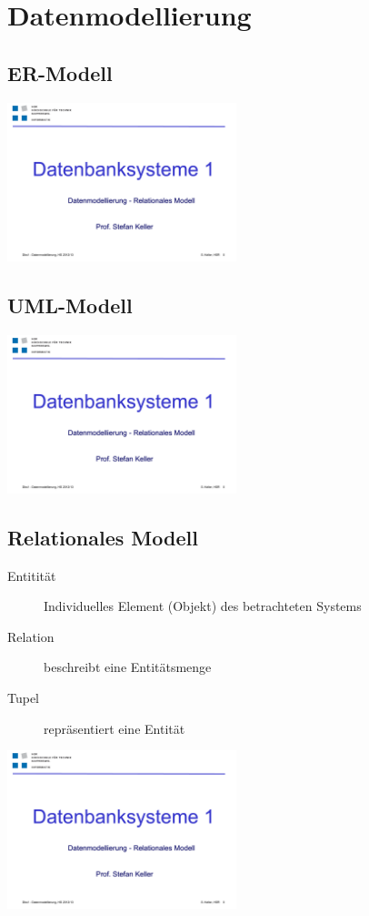 \section{Datenmodellierung}
    \begin{multicols}{2}
        \subsection{ER-Modell}
            \includegraphics[page=16,trim=20 120 20 140,clip=true,width=0.5\textwidth]{images/datenmodellierung.pdf}
        \subsection{UML-Modell}
            \includegraphics[page=29,trim=20 30 20 85,clip=true,width=0.5\textwidth]{images/datenmodellierung.pdf}
    \end{multicols}
    \begin{multicols}{2}        
        \subsection{Relationales Modell}
            \begin{description}
                \item[Entitität] Individuelles Element (Objekt) des betrachteten Systems
                \item[Relation] beschreibt eine Entitätsmenge
                \item[Tupel] repräsentiert eine Entität
            \end{description}
            \includegraphics[page=42,trim=10 30 0 84,clip=true,width=0.5\textwidth]{images/datenmodellierung.pdf}
    \end{multicols}    
